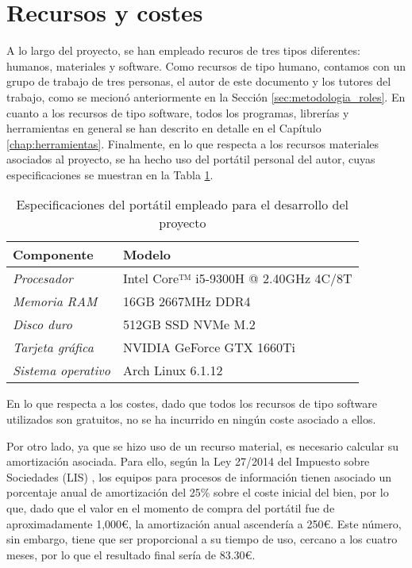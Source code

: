 \section{Recursos y costes}
\label{sec:planificacion_costes}

A lo largo del proyecto, se han empleado recuros de tres tipos diferentes: humanos, materiales y software.
Como recursos de tipo humano,
contamos con un grupo de trabajo de tres personas, el autor de este documento y los tutores del trabajo, 
como se mecionó anteriormente en la Sección \ref{sec:metodologia_roles}.
En cuanto a los recursos de tipo software, todos los programas, librerías y herramientas en general
se han descrito en detalle en el Capítulo \ref{chap:herramientas}.
Finalmente, en lo que respecta a los recursos materiales asociados al proyecto, se ha hecho uso del portátil personal del autor, 
cuyas especificaciones se muestran en la Tabla \ref{tab:costes_hardware}.

\bigskip
\begin{table}[H]
	\centering
	\begin{tabular}{|l|l|}
		\rowcolor{udcpink!25}
		\hline
		\small \textbf{Componente} & \small \textbf{Modelo} \\ \hline
		\small \textit{Procesador} & \small Intel Core™ i5-9300H @ 2.40GHz 4C/8T \\ \hline
		\small \textit{Memoria RAM} & \small 16GB 2667MHz DDR4 \\ \hline
		\small \textit{Disco duro} & \small 512GB SSD NVMe M.2 \\ \hline
		\small \textit{Tarjeta gráfica} & \small NVIDIA GeForce GTX 1660Ti \\ \hline
		\small \textit{Sistema operativo} & \small Arch Linux 6.1.12 \\ \hline
	\end{tabular}
	\caption{Especificaciones del portátil empleado para el desarrollo del proyecto}
	\label{tab:costes_hardware}
\end{table}

\bigskip
En lo que respecta a los costes, dado que todos los recursos de tipo software utilizados son gratuitos, no se ha incurrido en ningún coste
asociado a ellos.

\bigskip
Por otro lado, ya que se hizo uso de un recurso material,
es necesario calcular su amortización asociada. Para ello, según la Ley 27/2014 del Impuesto sobre Sociedades (LIS) \cite{leysociedades},
los equipos para procesos de información tienen asociado un porcentaje anual de amortización del 25\% sobre el coste inicial del bien,
por lo que, dado que el valor en el momento de compra del portátil fue de aproximadamente 1,000€, la amortización anual ascendería a 250€. Este número, sin embargo,
tiene que ser proporcional a su tiempo de uso, cercano a los cuatro meses, por lo que el resultado final sería de 83.30€.

